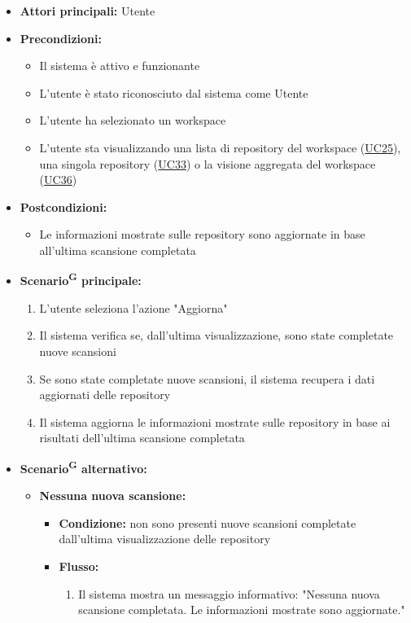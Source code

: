 \documentclass[a4paper, 11pt]{article}
\begin{document}
\begin{itemize}
	\item \textbf{Attori principali:} Utente
	\item \textbf{Precondizioni:}
	\begin{itemize}
		\item Il sistema è attivo e funzionante
		\item L'utente è stato riconosciuto dal sistema come Utente
		\item L'utente ha selezionato un workspace
		\item L'utente sta visualizzando una lista di repository del workspace (\hyperref[UC25]{UC25}), una singola repository (\hyperref[UC33]{UC33}) o la visione aggregata del workspace (\hyperref[UC36]{UC36})
	\end{itemize}
	\item \textbf{Postcondizioni:} 
	\begin{itemize}
		\item Le informazioni mostrate sulle repository sono aggiornate in base all'ultima scansione completata
	\end{itemize}
	\item \textbf{Scenario\textsuperscript{G} principale:}
	\begin{enumerate}
		\item L'utente seleziona l'azione "Aggiorna"
		\item Il sistema verifica se, dall'ultima visualizzazione, sono state completate nuove scansioni
		\item Se sono state completate nuove scansioni, il sistema recupera i dati aggiornati delle repository
		\item Il sistema aggiorna le informazioni mostrate sulle repository in base ai risultati dell'ultima scansione completata
	\end{enumerate}
	\item \textbf{Scenario\textsuperscript{G} alternativo:}
	\begin{itemize}
		\item \textbf{Nessuna nuova scansione:} 
			\begin{itemize}
				\item \textbf{Condizione:} non sono presenti nuove scansioni completate dall'ultima visualizzazione delle repository
				\item \textbf{Flusso:} 
				\begin{enumerate}
					\item Il sistema mostra un messaggio informativo: "Nessuna nuova scansione completata. Le informazioni mostrate sono aggiornate." 

\end{enumerate}
\end{itemize}
\end{itemize}
\end{itemize}
\end{document}
